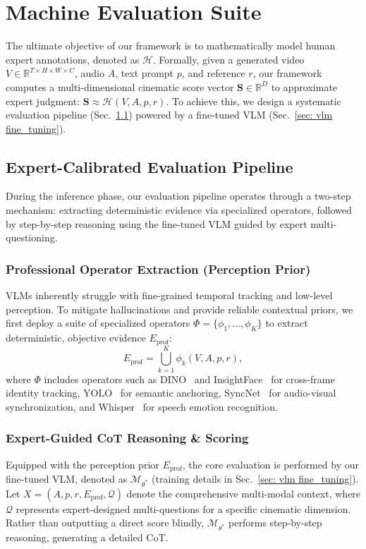 \documentclass{llmxive}
\begin{document}
\section{Machine Evaluation Suite}

The ultimate objective of our framework is to mathematically model human expert annotations, denoted as $\mathcal{H}$. Formally, given a generated video $V \in \mathbb{R}^{T \times H \times W \times C}$, audio $A$, text prompt $p$, and reference $r$, our framework computes a multi-dimensional cinematic score vector $\mathbf{S} \in \mathbb{R}^D$ to approximate expert judgment: $\mathbf{S} \approx \mathcal{H}(V, A, p, r)$. To achieve this, we design a systematic evaluation pipeline (Sec.~\ref{sec: machine pipeline}) powered by a fine-tuned VLM (Sec.~\ref{sec: vlm fine_tuning}).

\subsection{Expert-Calibrated Evaluation Pipeline}
\label{sec: machine pipeline}
During the inference phase, our evaluation pipeline operates through a two-step mechanism: extracting deterministic evidence via specialized operators, followed by step-by-step reasoning using the fine-tuned VLM guided by expert multi-questioning.

\subsubsection{Professional Operator Extraction (Perception Prior)} VLMs inherently struggle with fine-grained temporal tracking and low-level perception. To mitigate hallucinations and provide reliable contextual priors, we first deploy a suite of specialized operators $\Phi = \{\phi_1, \dots, \phi_K\}$ to extract deterministic, objective evidence $E_{\text{prof}}$:
\begin{equation}
    E_{\text{prof}} = \bigcup_{k=1}^{K} \phi_k(V, A, p, r),
\end{equation}
where $\Phi$ includes operators such as DINO~\cite{oquab2023dinov2} and InsightFace~\cite{arcface} for cross-frame identity tracking, YOLO~\cite{khanam2024yolov11} for semantic anchoring, SyncNet~\cite{syncnet} for audio-visual synchronization, and Whisper~\cite{whisper} for speech emotion recognition.

\subsubsection{Expert-Guided CoT Reasoning \& Scoring} Equipped with the perception prior $E_{\text{prof}}$, the core evaluation is performed by our fine-tuned VLM, denoted as $\mathcal{M}_{\theta^*}$ (training details in Sec.~\ref{sec: vlm fine_tuning}). Let $X = (A, p, r, E_{\text{prof}}, \mathcal{Q})$ denote the comprehensive multi-modal context, where $\mathcal{Q}$ represents expert-designed multi-questions for a specific cinematic dimension. Rather than outputting a direct score blindly, $\mathcal{M}_{\theta^*}$ performs step-by-step reasoning, generating a detailed CoT. 
\end{document}
